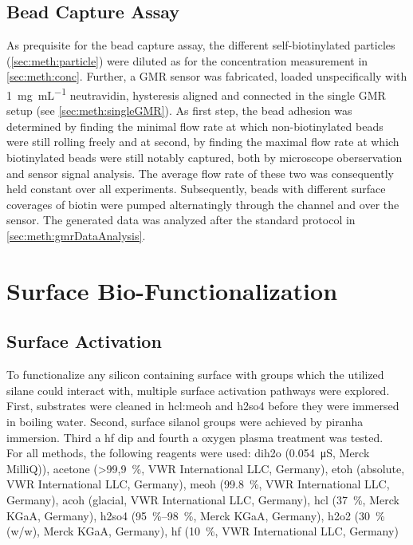 \subsection{Bead Capture Assay}
As prequisite for the bead capture assay, the different self-biotinylated particles (\cref{sec:meth:particle}) were diluted as for the concentration measurement in \cref{sec:meth:conc}.  Further, a GMR sensor was fabricated, loaded unspecifically with \SI{1}{\milli\gram\per\milli\liter} neutravidin, hysteresis aligned and connected in the single GMR setup (see \ref{sec:meth:singleGMR}). As first step, the bead adhesion was determined by finding the minimal flow rate at which non-biotinylated beads were still rolling freely and at second, by finding the maximal flow rate at which biotinylated beads were still notably captured, both by microscope oberservation and sensor signal analysis. The average flow rate of these two was consequently held constant over all experiments. Subsequently, beads with different surface coverages of biotin were pumped alternatingly through the channel and over the sensor. The generated data was analyzed after the standard protocol in \ref{sec:meth:gmrDataAnalysis}.

\section{Surface Bio-Functionalization}
\subsection{Surface Activation}
\label{sec:meth:surfActiv}
To functionalize any silicon containing surface with  groups which the utilized silane could interact with, multiple surface activation pathways were explored. First, substrates were cleaned in \gls{hcl}:\gls{meoh} and \gls{h2so4} before they were immersed in boiling water. Second, surface silanol groups were achieved by piranha immersion. Third a \gls{hf} dip and fourth a oxygen plasma treatment was tested.\\
For all methods, the following reagents were used: \gls{dih2o} (\SI{0,054}{\micro\siemens}, Merck MilliQ)), acetone (\SI{>99,9}{\percent}, VWR International LLC, Germany), \gls{etoh} (absolute, VWR International LLC, Germany), \gls{meoh} (\SI{99.8}{\percent}, VWR International LLC, Germany), \gls{acoh} (glacial,  VWR International LLC, Germany), \gls{hcl} (\SI{37}{\percent}, Merck KGaA, Germany), \gls{h2so4} (\SIrange{95}{98}{\percent}, Merck KGaA, Germany), \gls{h2o2} (\SI{30}{\percent} (w/w), Merck KGaA, Germany), \gls{hf} (\SI{10}{\percent},  VWR International LLC, Germany)

